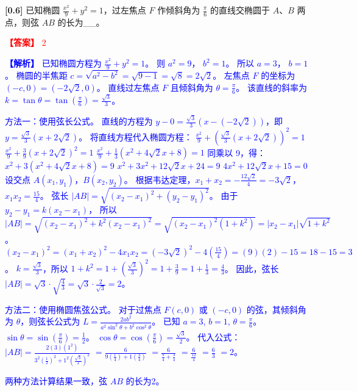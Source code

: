\documentclass[varwidth=16cm, border=2mm]{standalone}
\begin{document}
\textbf{[0.6]} 已知椭圆 $\frac{x^2}{9} + y^2 = 1$，过左焦点 $F$ 作倾斜角为 $\frac{\pi}{6}$ 的直线交椭圆于 $A$、$B$ 两点，则弦 $AB$ 的长为__。

\vspace{0.2cm}\par\noindent\textcolor{red}{\textbf{【答案】} 2}
\par\noindent\textcolor{blue}{\textbf{【解析】} 已知椭圆方程为 $\frac{x^2}{9} + y^2 = 1$。
则 $a^2 = 9$， $b^2 = 1$。
所以 $a = 3$， $b = 1$。
椭圆的半焦距 $c = \sqrt{a^2 - b^2} = \sqrt{9 - 1} = \sqrt{8} = 2\sqrt{2}$。
左焦点 $F$ 的坐标为 $(-c, 0) = (-2\sqrt{2}, 0)$。
直线过左焦点 $F$ 且倾斜角为 $\theta = \frac{\pi}{6}$。
该直线的斜率为 $k = \tan\theta = \tan(\frac{\pi}{6}) = \frac{\sqrt{3}}{3}$。

方法一：使用弦长公式。
直线的方程为 $y - 0 = \frac{\sqrt{3}}{3}(x - (-2\sqrt{2}))$，即 $y = \frac{\sqrt{3}}{3}(x + 2\sqrt{2})$。
将直线方程代入椭圆方程：
$\frac{x^2}{9} + (\frac{\sqrt{3}}{3}(x + 2\sqrt{2}))^2 = 1$
$\frac{x^2}{9} + \frac{3}{9}(x + 2\sqrt{2})^2 = 1$
$\frac{x^2}{9} + \frac{1}{3}(x^2 + 4\sqrt{2}x + 8) = 1$
同乘以 9，得：
$x^2 + 3(x^2 + 4\sqrt{2}x + 8) = 9$
$x^2 + 3x^2 + 12\sqrt{2}x + 24 = 9$
$4x^2 + 12\sqrt{2}x + 15 = 0$
设交点 $A(x_1, y_1)$，$B(x_2, y_2)$。
根据韦达定理，$x_1 + x_2 = -\frac{12\sqrt{2}}{4} = -3\sqrt{2}$， $x_1x_2 = \frac{15}{4}$。
弦长 $|AB| = \sqrt{(x_2-x_1)^2 + (y_2-y_1)^2}$。
由于 $y_2 - y_1 = k(x_2 - x_1)$，
所以 $|AB| = \sqrt{(x_2-x_1)^2 + k^2(x_2-x_1)^2} = \sqrt{(x_2-x_1)^2(1+k^2)} = |x_2-x_1|\sqrt{1+k^2}$。
$(x_2-x_1)^2 = (x_1+x_2)^2 - 4x_1x_2 = (-3\sqrt{2})^2 - 4(\frac{15}{4}) = (9)(2) - 15 = 18 - 15 = 3$。
$k = \frac{\sqrt{3}}{3}$，所以 $1+k^2 = 1 + (\frac{\sqrt{3}}{3})^2 = 1 + \frac{3}{9} = 1 + \frac{1}{3} = \frac{4}{3}$。
因此，弦长 $|AB| = \sqrt{3} \cdot \sqrt{\frac{4}{3}} = \sqrt{3} \cdot \frac{2}{\sqrt{3}} = 2$。

方法二：使用椭圆焦弦公式。
对于过焦点 $F(c, 0)$ 或 $(-c, 0)$ 的弦，其倾斜角为 $\theta$，则弦长公式为 $L = \frac{2ab^2}{a^2\sin^2\theta + b^2\cos^2\theta}$。
已知 $a=3$, $b=1$, $\theta = \frac{\pi}{6}$。
$\sin\theta = \sin(\frac{\pi}{6}) = \frac{1}{2}$。
$\cos\theta = \cos(\frac{\pi}{6}) = \frac{\sqrt{3}}{2}$。
代入公式：
$|AB| = \frac{2(3)(1^2)}{3^2(\frac{1}{2})^2 + 1^2(\frac{\sqrt{3}}{2})^2}$
$= \frac{6}{9(\frac{1}{4}) + 1(\frac{3}{4})}$
$= \frac{6}{\frac{9}{4} + \frac{3}{4}}$
$= \frac{6}{\frac{12}{4}}$
$= \frac{6}{3}$
$= 2$。

两种方法计算结果一致，弦 $AB$ 的长为2。}
\end{document}
